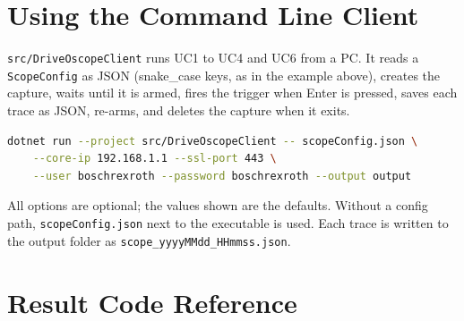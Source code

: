 \documentclass[11pt,a4paper]{article}
\newcommand{\dl}[1]{\texttt{#1}}
\begin{document}
\section{Using the Command Line Client}

\dl{src/DriveOscopeClient} runs UC1 to UC4 and UC6 from a PC. It reads a
\dl{ScopeConfig} as JSON (snake\_case keys, as in the example above), creates
the capture, waits until it is armed, fires the trigger when Enter is pressed,
saves each trace as JSON, re-arms, and deletes the capture when it exits.

\begin{lstlisting}[language=bash]
dotnet run --project src/DriveOscopeClient -- scopeConfig.json \
    --core-ip 192.168.1.1 --ssl-port 443 \
    --user boschrexroth --password boschrexroth --output output
\end{lstlisting}

All options are optional; the values shown are the defaults. Without a config
path, \dl{scopeConfig.json} next to the executable is used. Each trace is
written to the output folder as \dl{scope\_yyyyMMdd\_HHmmss.json}.

\section{Result Code Reference}
\end{document}

